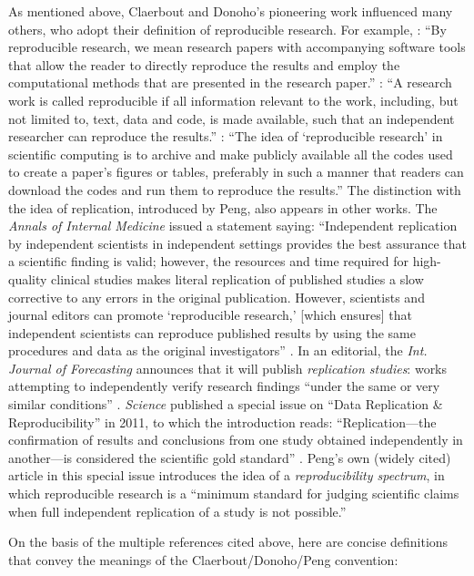 \documentclass{statement}
\begin{document}
As mentioned above, Claerbout and Donoho's pioneering work influenced many others, who adopt their definition of reproducible research. 
For example, \cite{gentlemanETal2007}: ``By reproducible research, we mean research papers with accompanying software tools that allow the reader to directly reproduce the results and employ the computational methods that are presented in the research paper.''
\cite{vandewalleETal2009}: ``A research work is called reproducible if all information relevant to the work, including, but not limited to, text, data and code, is made available, such that an independent researcher can reproduce the results.''
\cite{leveque2009}: ``The idea of `reproducible research' in scientific computing is to archive and make publicly available all the codes used to create a paper's figures or tables, preferably in such a manner that readers can download the codes and run them to reproduce the results.''
The distinction with the idea of replication, introduced by Peng, also appears in other works. 
The \emph{Annals of Internal Medicine} issued a statement saying: ``Independent replication by independent scientists in independent settings provides the best assurance that a scientific finding is valid; however, the resources and time required for high-quality clinical studies makes literal replication of published studies a slow corrective to any errors in the original publication. However, scientists and journal editors can promote `reproducible research,' [which ensures] that independent scientists can reproduce published results by using the same procedures and data as the original investigators'' \cite[]{laineETal2007}. 
In an editorial, the \emph{Int. Journal of Forecasting} announces that it will publish \emph{replication studies}: works attempting to independently verify research findings ``under the same or very similar conditions'' \cite[]{hyndman2010}. 
\emph{Science} published a special issue on ``Data Replication \& Reproducibility'' in 2011, to which the introduction reads: ``Replication---the confirmation of results and conclusions from one study obtained independently in another---is considered the scientific gold standard'' \cite[]{jasnyETal2011}.
Peng's own (widely cited) article in this special issue introduces the idea of a \emph{reproducibility spectrum}, in which reproducible research is a ``minimum standard for judging scientific claims when full independent replication of a study is not possible.'' \cite[]{peng2011}

On the basis of the multiple references cited above, here are concise definitions that convey the meanings of the Claerbout/Donoho/Peng convention:
\end{document}
